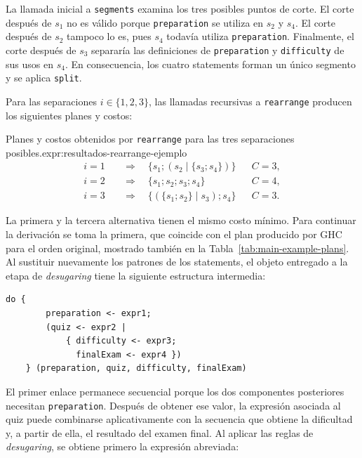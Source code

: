La llamada inicial a \texttt{segments} examina los tres posibles puntos de corte. El corte después de $s_1$ no es válido porque \texttt{preparation} se utiliza en $s_2$ y $s_4$. El corte después de $s_2$ tampoco lo es, pues $s_4$ todavía utiliza \texttt{preparation}. Finalmente, el corte después de $s_3$ separaría las definiciones de \texttt{preparation} y \texttt{difficulty} de sus usos en $s_4$. En consecuencia, los cuatro statements forman un único segmento y se aplica \texttt{split}.

Para las separaciones $i\in\{1,2,3\}$, las llamadas recursivas a \texttt{rearrange} producen los siguientes planes y costos:

\begin{ReportExpression}{Planes y costos obtenidos por \texttt{rearrange} para las tres separaciones posibles.}{expr:resultados-rearrange-ejemplo}
\[
\begin{aligned}
i=1 &\quad\Longrightarrow\quad
  \{s_1;(s_2\mid\{s_3;s_4\})\}
  && C=3,\\
i=2 &\quad\Longrightarrow\quad
  \{s_1;s_2;s_3;s_4\}
  && C=4,\\
i=3 &\quad\Longrightarrow\quad
  \{(\{s_1;s_2\}\mid s_3);s_4\}
  && C=3.
\end{aligned}
\]
\end{ReportExpression}

La primera y la tercera alternativa tienen el mismo costo mínimo. Para continuar la derivación se toma la primera, que coincide con el plan producido por \textsf{GHC} para el orden original, mostrado también en la Tabla~\ref{tab:main-example-plans}. Al sustituir nuevamente los patrones de los statements, el objeto entregado a la etapa de \textit{desugaring} tiene la siguiente estructura intermedia:

\begin{lstlisting}[style=haskell,caption={Plan intermedio producido por la etapa de \textit{rearrange}.},label={lst:applicative-do-main-example-rearranged}]
    do {
        preparation <- expr1;
        (quiz <- expr2 |
            { difficulty <- expr3;
              finalExam <- expr4 })
    } (preparation, quiz, difficulty, finalExam)
\end{lstlisting}

El primer enlace permanece secuencial porque los dos componentes posteriores necesitan \texttt{preparation}. Después de obtener ese valor, la expresión asociada al quiz puede combinarse aplicativamente con la secuencia que obtiene la dificultad y, a partir de ella, el resultado del examen final. Al aplicar las reglas de \textit{desugaring}, se obtiene primero la expresión abreviada:

